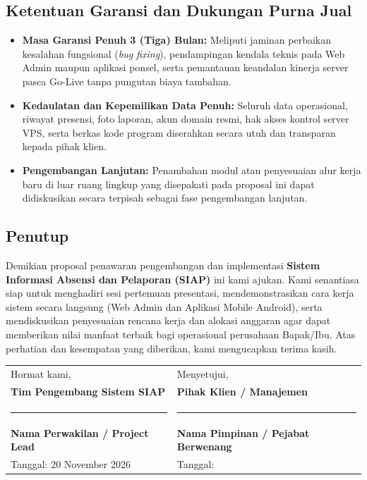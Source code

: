 \documentclass[11pt,a4paper]{article}
\begin{document}
\subsection{Ketentuan Garansi dan Dukungan Purna Jual}
\begin{itemize}
    \item \textbf{Masa Garansi Penuh 3 (Tiga) Bulan:} Meliputi jaminan perbaikan kesalahan fungsional (\textit{bug fixing}), pendampingan kendala teknis pada Web Admin maupun aplikasi ponsel, serta pemantauan keandalan kinerja server pasca Go-Live tanpa pungutan biaya tambahan.
    \item \textbf{Kedaulatan dan Kepemilikan Data Penuh:} Seluruh data operasional, riwayat presensi, foto laporan, akun domain resmi, hak akses kontrol server VPS, serta berkas kode program diserahkan secara utuh dan transparan kepada pihak klien.
    \item \textbf{Pengembangan Lanjutan:} Penambahan modul atau penyesuaian alur kerja baru di luar ruang lingkup yang disepakati pada proposal ini dapat didiskusikan secara terpisah sebagai fase pengembangan lanjutan.
\end{itemize}

\subsection{Penutup}
Demikian proposal penawaran pengembangan dan implementasi \textbf{Sistem Informasi Absensi dan Pelaporan (SIAP)} ini kami ajukan. Kami senantiasa siap untuk menghadiri sesi pertemuan presentasi, mendemonstrasikan cara kerja sistem secara langsung (Web Admin dan Aplikasi Mobile Android), serta mendiskusikan penyesuaian rencana kerja dan alokasi anggaran agar dapat memberikan nilai manfaat terbaik bagi operasional perusahaan Bapak/Ibu. Atas perhatian dan kesempatan yang diberikan, kami mengucapkan terima kasih.

\vspace{0.8cm}
\begin{tabularx}{\textwidth}{@{}C{7.5cm}C{7.5cm}@{}}
    Hormat kami, & Menyetujui, \\
    \textbf{Tim Pengembang Sistem SIAP} & \textbf{Pihak Klien / Manajemen} \\[1.7cm]
    \rule{5.5cm}{0.5pt} & \rule{5.5cm}{0.5pt} \\
    \textbf{Nama Perwakilan / Project Lead} & \textbf{Nama Pimpinan / Pejabat Berwenang} \\
    \footnotesize Tanggal: 20 November 2026 & \footnotesize Tanggal: \underline{\hspace{3.2cm}} \\
\end{tabularx}
\end{document}

